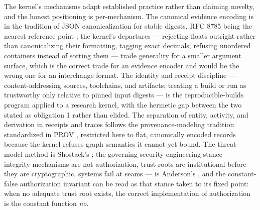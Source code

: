 The kernel's mechanisms adapt established practice rather than claiming novelty, and the honest positioning is per-mechanism. The canonical evidence encoding is in the tradition of JSON canonicalization for stable digests, RFC 8785 being the nearest reference point \cite{jcs}; the kernel's departures --- rejecting floats outright rather than canonicalizing their formatting, tagging exact decimals, refusing unordered containers instead of sorting them --- trade generality for a smaller argument surface, which is the correct trade for an evidence encoder and would be the wrong one for an interchange format. The identity and receipt discipline --- content-addressing sources, toolchains, and artifacts; treating a build or run as trustworthy only relative to pinned input digests --- is the reproducible-builds program \cite{reprobuilds} applied to a research kernel, with the hermetic gap between the two stated as obligation 1 rather than elided. The separation of entity, activity, and derivation in receipts and traces follows the provenance-modeling tradition standardized in PROV \cite{prov}, restricted here to flat, canonically encoded records because the kernel refuses graph semantics it cannot yet bound. The threat-model method is Shostack's \cite{shostack}; the governing security-engineering stance --- integrity mechanisms are not authorization, trust roots are institutional before they are cryptographic, systems fail at seams --- is Anderson's \cite{anderson}, and the constant-false authorization invariant can be read as that stance taken to its fixed point: when no adequate trust root exists, the correct implementation of authorization is the constant function \emph{no}.

